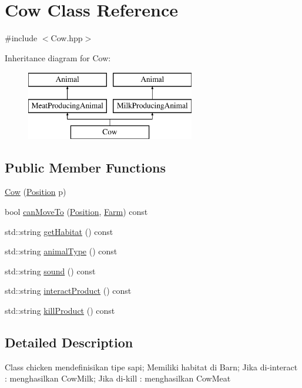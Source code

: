 \hypertarget{class_cow}{}\section{Cow Class Reference}
\label{class_cow}


{\ttfamily \#include $<$Cow.\+hpp$>$}

Inheritance diagram for Cow\+:\begin{figure}[H]
\begin{center}
\leavevmode
\includegraphics[height=3.000000cm]{class_cow}
\end{center}
\end{figure}
\subsection*{Public Member Functions}
\begin{DoxyCompactItemize}
\item 
\mbox{\hyperlink{class_cow_a5bcc9eea19bf9d656e9e16148f1efaa9}{Cow}} (\mbox{\hyperlink{class_position}{Position}} p)
\item 
bool \mbox{\hyperlink{class_cow_a3fc59f29ac63abeacde61165ff1faf2a}{can\+Move\+To}} (\mbox{\hyperlink{class_position}{Position}}, \mbox{\hyperlink{class_farm}{Farm}}) const
\item 
std\+::string \mbox{\hyperlink{class_cow_a16572694f707fef1a15767c7e219e64c}{get\+Habitat}} () const
\item 
std\+::string \mbox{\hyperlink{class_cow_a18d91d74f3b32a7ba9fc6c1db80c17df}{animal\+Type}} () const
\item 
std\+::string \mbox{\hyperlink{class_cow_a31d7c184a971dccda54fdf098c5f0460}{sound}} () const
\item 
std\+::string \mbox{\hyperlink{class_cow_aceeee175e5611b3c963dc3000991eaeb}{interact\+Product}} () const
\item 
std\+::string \mbox{\hyperlink{class_cow_a063e4f8d17216c2cdb4b967d508e1c92}{kill\+Product}} () const
\end{DoxyCompactItemize}


\subsection{Detailed Description}
Class chicken mendefinisikan tipe sapi; Memiliki habitat di Barn; Jika di-\/interact \+: menghasilkan Cow\+Milk; Jika di-\/kill \+: menghasilkan Cow\+Meat 

